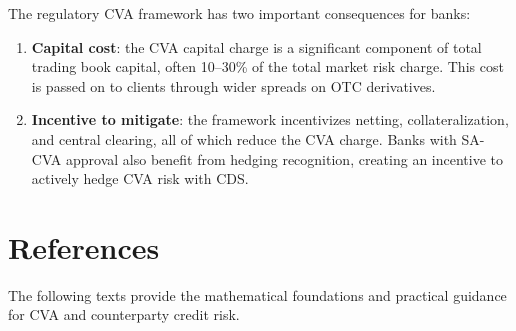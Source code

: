 \documentclass[11pt, a4paper]{article}
\theoremstyle{definition}
\theoremstyle{plain}
\theoremstyle{remark}
\begin{document}
\begin{keyresult}
The regulatory CVA framework has two important consequences for banks:
\begin{enumerate}
    \item \textbf{Capital cost}: the CVA capital charge is a significant component
          of total trading book capital, often 10--30\% of the total market risk charge.
          This cost is passed on to clients through wider spreads on OTC derivatives.
    \item \textbf{Incentive to mitigate}: the framework incentivizes netting,
          collateralization, and central clearing, all of which reduce the CVA charge.
          Banks with SA-CVA approval also benefit from hedging recognition,
          creating an incentive to actively hedge CVA risk with CDS.
\end{enumerate}
\end{keyresult}

\section{References}
\label{sec:references}

The following texts provide the mathematical foundations and practical guidance
for CVA and counterparty credit risk.
\end{document}
